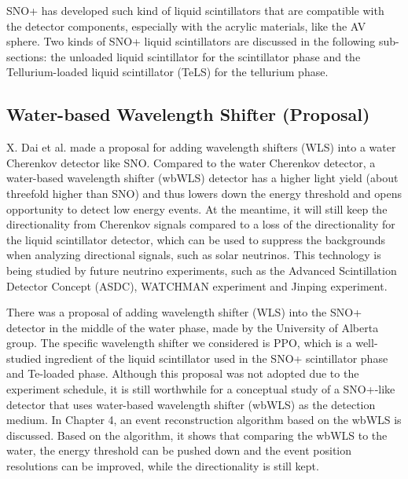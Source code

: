 SNO+ has developed such kind of liquid scintillators that are compatible with the detector components, especially with the acrylic materials, like the AV sphere. Two kinds of SNO+ liquid scintillators are discussed in the following sub-sections: the unloaded liquid scintillator for the scintillator phase and the Tellurium-loaded liquid scintillator (TeLS) for the tellurium phase.

\subsection{Water-based Wavelength Shifter (Proposal)}\label{sect:wbWLS}
X. Dai et al.\cite{dai2008wavelength} made a proposal for adding wavelength shifters (WLS) into a water Cherenkov detector like SNO. Compared to the water Cherenkov detector, a water-based wavelength shifter (wbWLS) detector has a higher light yield (about threefold higher than SNO\cite{dai2008wavelength}) and thus lowers down the energy threshold and opens opportunity to detect low energy events. At the meantime, it will still keep the directionality from Cherenkov signals compared to a loss of the directionality for the liquid scintillator detector, which can be used to suppress the backgrounds when analyzing directional signals, such as solar neutrinos. This technology is being studied by future neutrino experiments, such as the Advanced Scintillation Detector Concept (ASDC)\cite{alonso2014advanced}, WATCHMAN experiment\cite{askins2015physics} and Jinping experiment\cite{beacom2017physics}.

There was a proposal of adding wavelength shifter (WLS) into the SNO+ detector in the middle of the water phase, made by the University of Alberta group. The specific wavelength shifter we considered is PPO, which is a well-studied ingredient of the liquid scintillator used in the SNO+ scintillator phase and Te-loaded phase. Although this proposal was not adopted due to the experiment schedule, it is still worthwhile for a conceptual study of a SNO+-like detector that uses water-based wavelength shifter (wbWLS) as the detection medium. In Chapter 4, an event reconstruction algorithm based on the wbWLS is discussed. Based on the algorithm, it shows that comparing the wbWLS to the water, the energy threshold can be pushed down and the event position resolutions can be improved, while the directionality is still kept.

